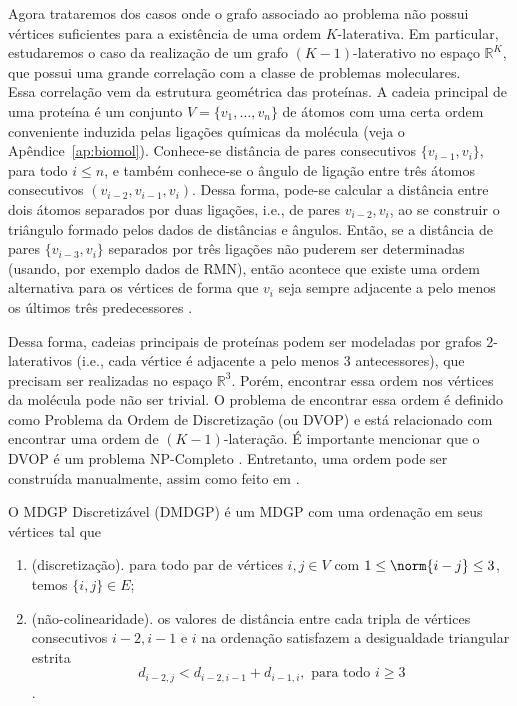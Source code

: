 Agora trataremos dos casos onde o grafo associado ao problema não possui vértices suficientes para a existência de uma ordem $K$-laterativa. Em particular, estudaremos o caso da realização de um grafo $(K-1)$-laterativo no espaço $\mathbb{R}^K$, que possui uma grande correlação com a classe de problemas moleculares.
\\

Essa correlação vem da estrutura geométrica das proteínas. A cadeia principal de uma proteína é um conjunto $V = \{v_1,\dots,v_n\}$ de átomos com uma certa ordem conveniente induzida pelas ligações químicas da molécula (veja o Apêndice~\ref{ap:biomol}). Conhece-se distância de pares consecutivos $\{v_{i-1},v_i\}$, para todo $i\leq n$, e também conhece-se o ângulo de ligação entre três átomos consecutivos $(v_{i-2},v_{i-1}, v_i)$. Dessa forma, pode-se calcular a distância entre dois átomos separados por duas ligações, i.e., de pares ${v_{i-2},v_i}$, ao se construir o triângulo formado pelos dados de distâncias e ângulos. Então, se a distância de pares $\{v_{i-3},v_i\}$ separados por três ligações não puderem ser determinadas (usando, por exemplo dados de RMN), então acontece que existe uma ordem alternativa para os vértices de forma que $v_i$ seja sempre adjacente a pelo menos os últimos três predecessores \cite{libertiEDG}.

Dessa forma, cadeias principais de proteínas podem ser modeladas por grafos $2$-laterativos (i.e., cada vértice é adjacente a pelo menos 3 antecessores), que precisam ser realizadas no espaço $\mathbb{R}^3$. Porém, encontrar essa ordem nos vértices da molécula pode não ser trivial. O problema de encontrar essa ordem é definido como Problema da Ordem de Discretização (ou DVOP) e está relacionado com encontrar uma ordem de $(K-1)$-lateração. É importante mencionar que o DVOP é um problema NP-Completo \cite{carlile:dvopComplexity}. Entretanto, uma ordem pode ser construída manualmente, assim como feito em \cite{carlile:MinimalOrder,douglasSideChainOrder}. 

\begin{definicao}
	O MDGP Discretizável (DMDGP) é um MDGP com uma ordenação em seus vértices tal que
	\begin{enumerate}
		\vspace{-0.2cm}
		\item (discretização). para todo par de vértices $i,j\in V$ com $1\leq \norm{i-j} \leq 3$, temos $\{i,j\} \in E$;
		\vspace{-0.2cm}
		\item (não-colinearidade). os valores de distância entre cada tripla de vértices consecutivos $i-2,i-1$ e $i$ na ordenação satisfazem a desigualdade triangular estrita $$d_{i-2,j}<d_{i-2,i-1}+d_{i-1,i}, \text{ para todo } i\geq 3$$.
	\end{enumerate}
\end{definicao}

